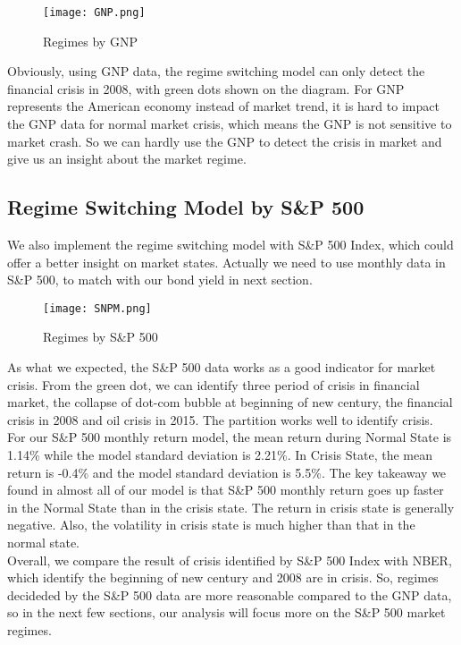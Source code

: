 \documentclass[12pt]{article}
\begin{document}
\begin{figure}[H]
\centering
\texttt{[image: GNP.png]}\\
\caption{Regimes by GNP}
\end{figure}

Obviously, using GNP data, the regime switching model can only detect the financial crisis in 2008, with green dots shown on the diagram. For GNP represents the American economy instead of market trend, it is hard to impact the GNP data for normal market crisis, which means the GNP is not sensitive to market crash. So we can hardly use the GNP to detect the crisis in market and give us an insight about the market regime.

\subsection{Regime Switching Model by S\&P 500}
We also implement the regime switching model with S\&P 500 Index, which could offer a better insight on market states. Actually we need to use monthly data in S\&P 500, to match with our bond yield in next section.

\begin{figure}[H]
\centering
\texttt{[image: SNPM.png]}\\
\caption{Regimes by S\&P 500}
\end{figure}

As what we expected, the S\&P 500 data works as a good indicator for market crisis. From the green dot, we can identify three period of crisis in financial market, the collapse of dot-com bubble at beginning of new century, the financial crisis in 2008 and oil crisis in 2015. The partition works well to identify crisis.\\

For our S\&P 500 monthly return model, the mean return during Normal State is 1.14\% while the model standard deviation is 2.21\%. In Crisis State, the mean return is -0.4\% and the model standard deviation is 5.5\%. The key takeaway we found in almost all of our model is that S\&P 500 monthly return goes up faster in the Normal State than in the crisis state. The return in crisis state is generally negative. Also, the volatility in crisis state is much higher than that in the normal state.\\

Overall, we compare the result of crisis identified by S\&P 500 Index with NBER, which identify the beginning of new century and 2008 are in crisis. So, regimes decideded by the S\&P 500 data are more reasonable compared to the GNP data, so in the next few sections, our analysis will focus more on the S\&P 500 market regimes. 
\end{document}

